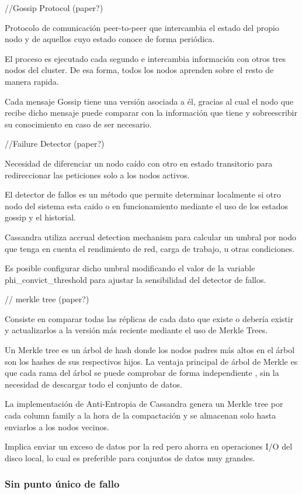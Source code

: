 //Gossip Protocol (paper?)

Protocolo de comunicación peer-to-peer que intercambia el estado del propio nodo y de aquellos cuyo estado conoce de forma periódica.

El proceso es ejecutado cada segundo e intercambia información con otros tres nodos del cluster. De esa forma, todos los nodos aprenden sobre el resto de manera rapida.

Cada mensaje Gossip tiene una versión asociada a él, gracias al cual el nodo que recibe dicho mensaje puede comparar con la información que tiene y sobreescribir su conocimiento en caso de ser necesario.

//Failure Detector (paper?)

Necesidad de diferenciar un nodo caído con otro en estado transitorio para redireccionar las peticiones solo a los nodos activos.

El detector de fallos es un método que permite determinar localmente si otro nodo del sistema esta caido o en funcionamiento mediante el uso de los estados gossip y el historial.

Cassandra utiliza accrual detection mechanism para calcular un umbral por nodo que tenga en cuenta el rendimiento de red, carga de trabajo, u otras condiciones.

Es posible configurar dicho umbral modificando el valor de la variable phi_convict_threshold para ajustar la sensibilidad del detector de fallos.

// merkle tree (paper?)

Consiste en comparar todas las réplicas de cada dato que existe o debería existir y actualizarlos a la versión más reciente mediante el uso de Merkle Trees.

Un Merkle tree es un árbol de hash donde los nodos padres más altos en el árbol son los hashes de sus respectivos hijos. La ventaja principal de árbol de Merkle es que cada rama del árbol se puede comprobar de forma independiente , sin la necesidad de descargar todo el conjunto de datos.

La implementación de Anti-Entropia de Cassandra genera un Merkle tree por cada column family a la hora de la compactación y se almacenan solo hasta enviarlos a los nodos vecinos. 

Implica enviar un exceso de datos por la red pero ahorra en operaciones I/O del disco local, lo cual es preferible para conjuntos de datos muy grandes.

\subsubsection{Sin punto único de fallo}

